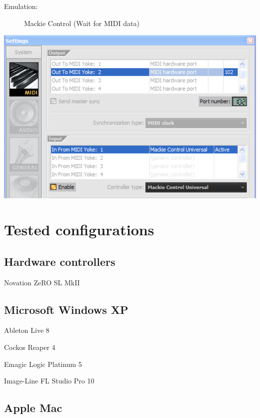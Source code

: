 \begin{description}
\item[Emulation:] Mackie Control (Wait for MIDI data)
\end{description}

\includegraphics[scale=\screenshotscale,clip]{include/images/fl_studio_10.png}


\chapter{Tested configurations}
\label{chap:tested_configurations}

\section{Hardware controllers}

\begin{compactitem}
\item Novation ZeRO SL MkII
\end{compactitem}

\section{Microsoft Windows XP}

\begin{compactitem}
\item Ableton Live 8
\item Cockos Reaper 4
\item Emagic Logic Platinum 5
\item Image-Line FL Studio Pro 10
\end{compactitem}

\section{Apple Mac}


